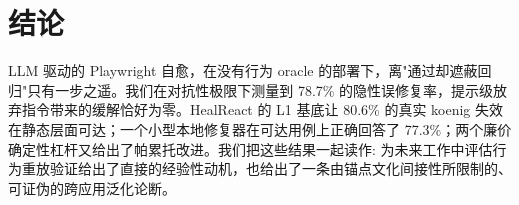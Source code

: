 \section{结论}
\label{sec:conclusion}

LLM 驱动的 Playwright 自愈，在没有行为 oracle 的部署下，离"通过却遮蔽回归"只有一步之遥。我们在对抗性极限下测量到 78.7\% 的隐性误修复率，提示级放弃指令带来的缓解恰好为零。HealReact 的 L1 基底让 80.6\% 的真实 koenig 失效在静态层面可达；一个小型本地修复器在可达用例上正确回答了 77.3\%；两个廉价确定性杠杆又给出了帕累托改进。我们把这些结果一起读作: 为未来工作中评估行为重放验证给出了直接的经验性动机，也给出了一条由锚点文化间接性所限制的、可证伪的跨应用泛化论断。
